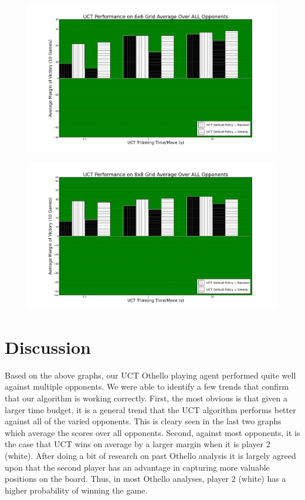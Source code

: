 \documentclass[12pt,letterpaper]{article}
\begin{document}
\begin{figure}[!hp]
\begin{center}
\includegraphics[scale=.4]{66_ALL}
\end{center}
\end{figure}

\begin{figure}[!hp]
\begin{center}
\includegraphics[scale=.4]{88_ALL}
\end{center}
\end{figure}


\pagebreak
\section{Discussion}
\label{disc}
Based on the above graphs, our UCT Othello playing agent performed quite well against multiple opponents. We were able to identify a few trends that confirm that our algorithm is working correctly.  First, the most obvious is that given a larger time budget, it is a general trend that the UCT algorithm performs better against all of the varied opponents. This is cleary seen in the last two graphs which average the scores over all opponents. Second, against most opponents, it is the case that UCT wins on average by a larger margin when it is player 2 (white). After doing a bit of research on past Othello analysis it is largely agreed upon that the second player has an advantage in capturing more valuable positions on the board. Thus, in most Othello analyses, player 2 (white) has a higher probability of winning the game. 
\end{document}
